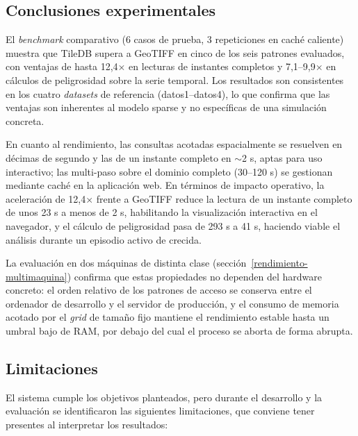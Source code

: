 \subsection{Conclusiones experimentales}\label{conclusiones-experimentales}

El \textit{benchmark} comparativo (6 casos de prueba, 3 repeticiones en caché caliente) muestra que TileDB supera a GeoTIFF en cinco de los seis patrones evaluados, con ventajas de hasta 12,4$\times$ en lecturas de instantes completos y 7,1--9,9$\times$ en cálculos de peligrosidad sobre la serie temporal. Los resultados son consistentes en los cuatro \textit{datasets} de referencia (datos1--datos4), lo que confirma que las ventajas son inherentes al modelo sparse y no específicas de una simulación concreta.

En cuanto al rendimiento, las consultas acotadas espacialmente se resuelven en décimas de segundo y las de un instante completo en $\sim$2 s, aptas para uso interactivo; las multi-paso sobre el dominio completo (30--120 s) se gestionan mediante caché en la aplicación web. En términos de impacto operativo, la aceleración de 12,4$\times$ frente a GeoTIFF reduce la lectura de un instante completo de unos 23 s a menos de 2 s, habilitando la visualización interactiva en el navegador, y el cálculo de peligrosidad pasa de 293 s a 41 s, haciendo viable el análisis durante un episodio activo de crecida.

La evaluación en dos máquinas de distinta clase (sección~\ref{rendimiento-multimaquina}) confirma que estas propiedades no dependen del hardware concreto: el orden relativo de los patrones de acceso se conserva entre el ordenador de desarrollo y el servidor de producción, y el consumo de memoria acotado por el \textit{grid} de tamaño fijo mantiene el rendimiento estable hasta un umbral bajo de RAM, por debajo del cual el proceso se aborta de forma abrupta.

\subsection{Limitaciones}\label{limitaciones}

El sistema cumple los objetivos planteados, pero durante el desarrollo y la evaluación se identificaron las siguientes limitaciones, que conviene tener presentes al interpretar los resultados:

